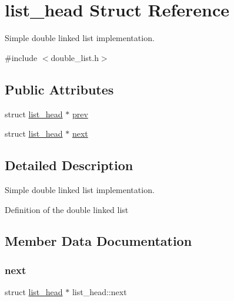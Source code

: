 \hypertarget{structlist__head}{}\section{list\+\_\+head Struct Reference}
\label{structlist__head}


Simple double linked list implementation.  




{\ttfamily \#include $<$double\+\_\+list.\+h$>$}

\subsection*{Public Attributes}
\begin{DoxyCompactItemize}
\item 
struct \mbox{\hyperlink{structlist__head}{list\+\_\+head}} $\ast$ \mbox{\hyperlink{structlist__head_ae4298f7975979e5f6bb406c40c1fa443}{prev}}
\item 
struct \mbox{\hyperlink{structlist__head}{list\+\_\+head}} $\ast$ \mbox{\hyperlink{structlist__head_a44b2d28c78f7266869b3f00390bec772}{next}}
\end{DoxyCompactItemize}


\subsection{Detailed Description}
Simple double linked list implementation. 

Definition of the double linked list 

\subsection{Member Data Documentation}
\mbox{\label{structlist__head_a44b2d28c78f7266869b3f00390bec772}} 
\subsubsection{\texorpdfstring{next}{next}}
{\footnotesize\ttfamily struct \mbox{\hyperlink{structlist__head}{list\+\_\+head}} $\ast$ list\+\_\+head\+::next}

\mbox{\label{structlist__head_ae4298f7975979e5f6bb406c40c1fa443}} 
